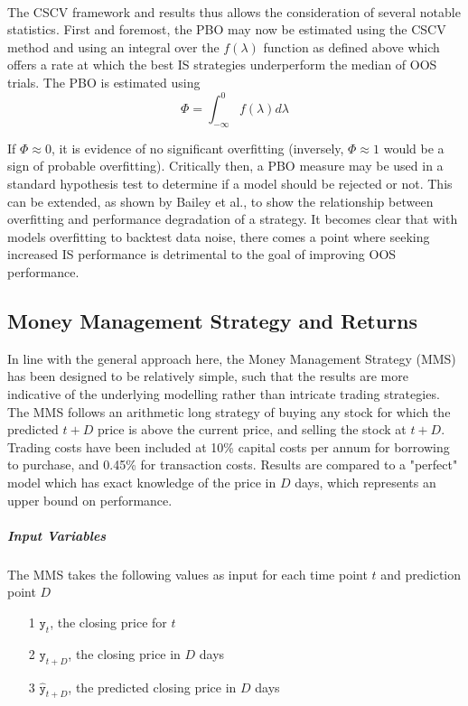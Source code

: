 \documentclass[a4paper,11pt,oneside]{article}
\theoremstyle{plain}
\theoremstyle{definition}
\begin{document}
\texttt{\\}
\newline The CSCV framework and results thus allows the consideration of several notable statistics. First and foremost, 
the PBO may now be estimated using the CSCV method and using an integral over the $f(\lambda)$ function 
as defined above which offers a rate at which the best IS strategies underperform the median of OOS trials. The PBO is estimated using
\begin{equation}
\Phi = \int_{-\infty}^{0} f (\lambda) d \lambda
\end{equation}


If $\Phi \approx 0$,
it is evidence of no significant overfitting (inversely, $\Phi \approx 1$ would be a sign of probable overfitting). Critically then, a PBO measure may be used in a standard hypothesis test to determine if a model should be rejected or not. This 
can be extended, as shown by Bailey et al., to show the relationship between overfitting and performance 
degradation of a strategy. It becomes clear that with models overfitting to backtest data noise, there comes a point 
where seeking increased IS performance is detrimental to the goal of improving OOS performance.  
\hfill \break 


\subsection{Money Management Strategy and Returns}\label{imp_mms}

In line with the general approach here, the Money Management Strategy (MMS) has been designed to be relatively simple, such that the results are more indicative of the underlying modelling rather than intricate trading strategies. The MMS follows an arithmetic long strategy of buying any stock for which the predicted ${t+D}$ price is above the current price, and selling the stock at ${t+D}$. Trading costs have been included at 10\% capital costs per annum for borrowing to purchase, and 0.45\% for transaction costs. Results are compared to a "perfect" model which has exact knowledge of the price in $D$ days, which represents an upper bound on performance.
\hfill\break

\subparagraph{Input Variables}

The MMS takes the following values as input for each time point $t$  and prediction point $D$
\begin{itemize}
	\item [1] {$\texttt{y}_t$}, the closing price for $t$
	\item [2] $\texttt{y}_{t+D}$, the closing price in $D$ days
	\item [3] $\hat{\texttt{y}}_{t+D}$, the predicted closing price in $D$ days
\end{itemize}
\end{document}
